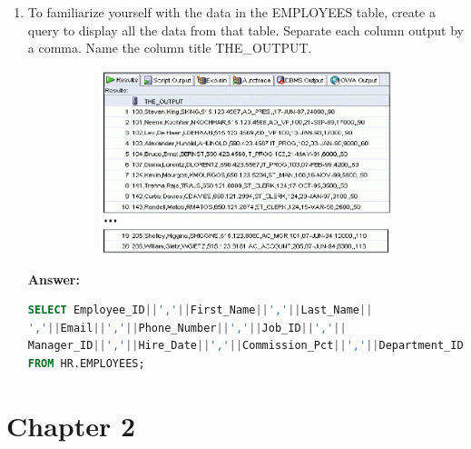 \documentclass[a4paper,12pt]{article}
\begin{document}
\begin{enumerate}[start=8]
    \item To familiarize yourself with the data in the EMPLOYEES table, create a query to display all the data from that table. Separate each column output by a comma. Name the column title THE\_OUTPUT.
    \begin{figure}[h]
        \centering
        \begin{subfigure}[b]{0.4\linewidth}
            \centering
            \includegraphics[width=\linewidth]{graphics/10.png}
        \end{subfigure}
    \end{figure}

    \textbf{Answer: }
    \begin{lstlisting}[language=SQL, label={lst:employees_data}]
SELECT Employee_ID||','||First_Name||','||Last_Name||
','||Email||','||Phone_Number||','||Job_ID||','||
Manager_ID||','||Hire_Date||','||Commission_Pct||','||Department_ID AS THE_OUTPUT
FROM HR.EMPLOYEES;
    \end{lstlisting}
    
\end{enumerate}
\newpage
\section*{Chapter 2}
\end{document}

